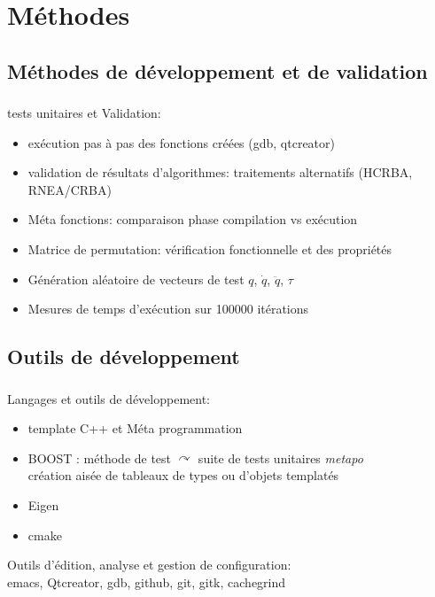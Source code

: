 \documentclass[10pt]{beamer}
\begin{document}
\section{Méthodes}

\subsection{Méthodes de développement et de validation}

\begin{frame}
  \frametitle{}
  
  
\end{frame}

\begin{frame}

  tests unitaires et Validation:
  \begin{itemize}
		\item exécution pas à pas des fonctions créées (gdb, qtcreator)
		\item validation de résultats d'algorithmes: traitements alternatifs (HCRBA, RNEA/CRBA)
		\item Méta fonctions: comparaison phase compilation vs exécution
		\item Matrice de permutation: vérification fonctionnelle et des propriétés 
		\item Génération aléatoire de vecteurs de test $q$, $\dot{q}$, $\ddot{q}$, $\tau$
		\item Mesures de temps d'exécution sur 100000 itérations
  \end{itemize}

\end{frame}


\subsection{Outils de développement}

\begin{frame}
  \frametitle{}
  Langages et outils de développement:
  \begin{itemize}
  \item template C++ et Méta programmation
  \item BOOST : méthode de test $\curvearrowright$ suite de tests unitaires \emph{metapo} \\
                création aisée de tableaux de types ou d'objets templatés
  \item Eigen
  \item cmake
  \end{itemize}
  
  \bigskip
  Outils d'édition, analyse et gestion de configuration:\\
  emacs, Qtcreator, gdb, github, git, gitk, cachegrind
    
\end{frame}
\end{document}
